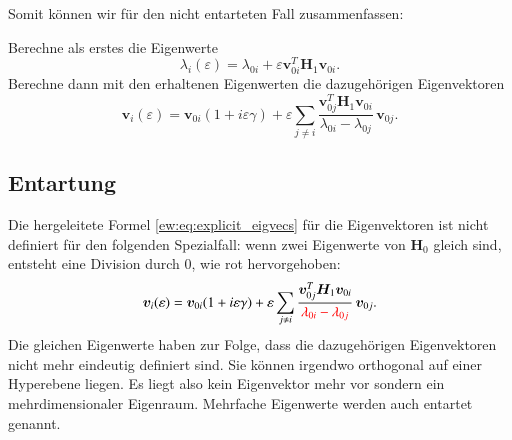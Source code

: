 Somit können wir für den nicht entarteten Fall zusammenfassen:
\begin{ewaufloesung}
    Berechne als erstes die Eigenwerte
    \begin{equation*}
        \lambda_i(\varepsilon)
        =
        \lambda_{0i} + \varepsilon \bm v_{0i}^T \bm H_1 \bm v_{0i}.
    \end{equation*}
    Berechne dann mit den erhaltenen Eigenwerten die dazugehörigen Eigenvektoren
    \begin{equation*}
        \bm v_i(\varepsilon)
        =
        \bm v_{0i} ( 1 + i \varepsilon \gamma ) + \varepsilon \sum_{j \neq i}
        \frac{\bm v_{0j}^T \bm H_1 \bm v_{0i}}{\lambda_{0i} - \lambda_{0j}}
        \, \bm v_{0j}.
    \end{equation*}
\end{ewaufloesung}

\subsection{Entartung}

Die hergeleitete Formel \eqref{ew:eq:explicit_eigvecs} für die Eigenvektoren ist nicht definiert für den folgenden Spezialfall:
wenn zwei Eigenwerte von $\bm H_0$ gleich sind, entsteht eine Division durch $0$, wie rot hervorgehoben:
\begin{equation*} %
    \bm v_i(\varepsilon)
    =
    \bm v_{0i} ( 1 + i \varepsilon \gamma ) + \varepsilon \sum_{j \neq i}
    \frac{\bm v_{0j}^T \bm H_1 \bm v_{0i}}{\RD{\lambda_{0i} - \lambda_{0j}}}
    \, \bm v_{0j}.
\end{equation*}
Die gleichen Eigenwerte haben zur Folge, dass die dazugehörigen Eigenvektoren nicht mehr eindeutig definiert sind.
Sie können irgendwo orthogonal auf einer Hyperebene liegen.
Es liegt also kein Eigenvektor mehr vor sondern ein mehrdimensionaler Eigenraum.
Mehrfache Eigenwerte werden auch entartet genannt.

